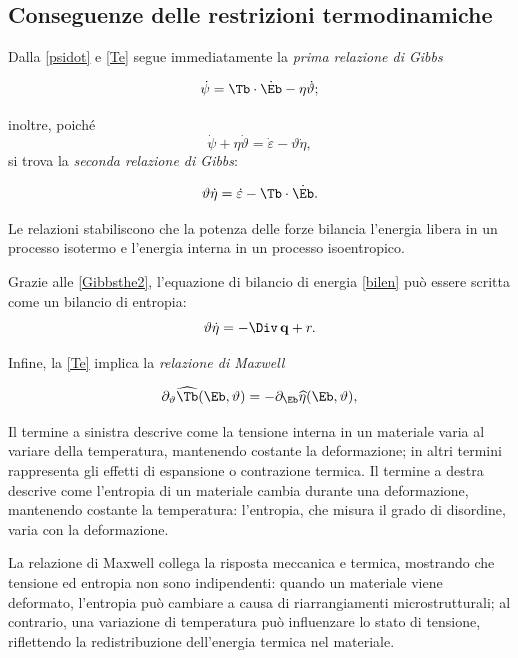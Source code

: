 \subsection{Conseguenze delle restrizioni termodinamiche}
Dalla \eqref{psidot}  e \eqref{Te} segue immediatamente la \textit{prima relazione di Gibbs}
\begin{definition}
\begin{equation}
\dot\psi=\Tb \cdot \dot\Eb-\eta \dot \vartheta;
\end{equation}
\end{definition}
inoltre, poiché
\begin{equation}
	\dot{\psi}+\eta\dot\vartheta=\dot{\varepsilon}-\vartheta\dot{\eta},
\end{equation}
si trova la \textit{seconda relazione di Gibbs}:
\begin{definition}
\begin{equation}\label{Gibbsthe2}
\vartheta\dot{\eta}=\dot\varepsilon-\Tb\cdot\dot{\Eb}.
\end{equation}
\end{definition}
Le relazioni stabiliscono che la potenza delle forze bilancia l'energia libera in un processo isotermo e l'energia interna in un processo isoentropico.

Grazie alle \eqref{Gibbsthe2}, l'equazione di bilancio di energia \eqref{bilen} può essere scritta come un bilancio di entropia:
\begin{equation}\label{bilentro}
\vartheta\dot{\eta}= - \Div \, \mathbf{q} + r.
\end{equation}

Infine, la \eqref{Te} implica la \textit{relazione di Maxwell}
\begin{definition}
\begin{equation}
\partial_\vartheta\widehat{\Tb}(\Eb, \vartheta)=-\partial_\Eb\widehat{\eta}(\Eb, \vartheta),
\end{equation}
\end{definition}
 Il  termine a sinistra  descrive come la tensione interna in un materiale varia al variare della temperatura, mantenendo costante la deformazione; in altri termini rappresenta gli effetti di espansione o contrazione termica. 
Il termine a destra  descrive come l’entropia di un materiale cambia durante una deformazione, mantenendo costante la temperatura: l’entropia, che misura il grado di disordine, varia con la deformazione.

 La relazione di Maxwell collega la risposta meccanica e termica, mostrando che tensione ed entropia non sono indipendenti: quando un materiale viene deformato,  l’entropia può cambiare a causa di riarrangiamenti microstrutturali; al contrario, una variazione di temperatura può influenzare lo stato di tensione, riflettendo la redistribuzione dell’energia termica nel materiale.
 
